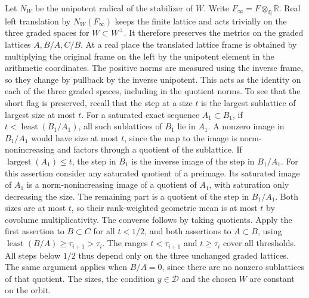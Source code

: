 Let \(N_W\) be the unipotent radical of the stabilizer of \(W\).
Write \(F_\infty=F\otimes_{\mathbb Q}\mathbb R\).
Real left translation by \(N_W(F_\infty)\) keeps the finite lattice
and acts trivially on the three graded spaces for
\(W\subset W^\perp\). It therefore preserves the metrics on the
graded lattices \(A,B/A,C/B\). At a real place the translated
lattice frame is obtained by multiplying the original frame
on the left by the unipotent element in the arithmetic coordinates.
The positive norms are measured using the inverse frame, so they
change by pullback by the inverse unipotent. This acts as the identity
on each of the three graded spaces, including in the quotient norms.
To see that the short flag is preserved, recall that the step at a
size \(t\) is the largest sublattice of largest size at most \(t\).
For a saturated exact sequence \(A_1\subset B_1\), if
\(t<\operatorname{least}(B_1/A_1)\), all such sublattices of \(B_1\)
lie in \(A_1\). A nonzero image in \(B_1/A_1\) would have size at
most \(t\), since the map to the image is norm-nonincreasing and
factors through a quotient of the sublattice. If
\(\operatorname{largest}(A_1)\le t\), the step in \(B_1\) is the
inverse image of the step in \(B_1/A_1\). For this assertion consider
any saturated quotient of a preimage. Its saturated image of \(A_1\)
is a norm-nonincreasing image of a quotient of \(A_1\), with saturation
only decreasing the size. The remaining part is a quotient of the
step in \(B_1/A_1\). Both sizes are at most \(t\), so their
rank-weighted geometric mean is at most \(t\) by covolume
multiplicativity. The converse follows by taking quotients.
Apply the first assertion to \(B\subset C\) for all \(t<1/2\), and
both assertions to \(A\subset B\), using
\(\operatorname{least}(B/A)\ge\tau_{i+1}>\tau_i\). The ranges
\(t<\tau_{i+1}\) and \(t\ge\tau_i\) cover all thresholds. All steps
below \(1/2\) thus depend only on the three unchanged graded lattices.
The same argument applies when \(B/A=0\), since there are no nonzero
sublattices of that quotient.
The sizes, the condition \(y\in\mathscr D\) and the chosen \(W\) are constant
on the orbit.

